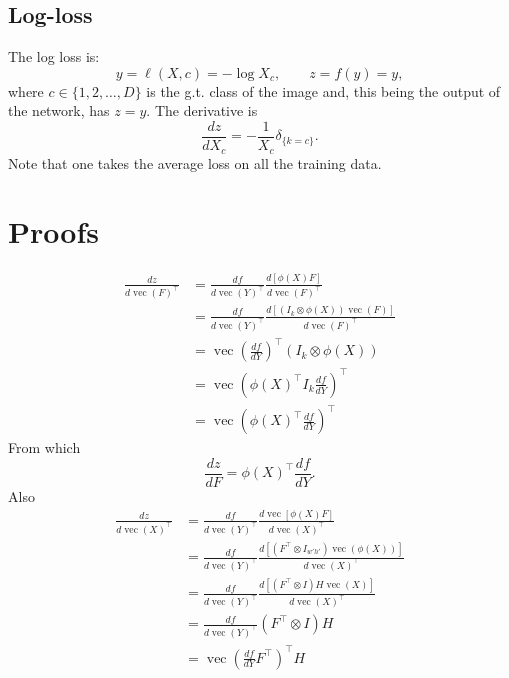 \documentclass[12pt]{article}
\newcommand{\vv}{\operatorname{vec}}
\begin{document}
\subsection{Log-loss}\label{s:loss}

The log loss is:
\[
 y = \ell(X,c) = - \log X_c, \qquad z = f(y) = y,
\]
where $c \in \{1,2,\dots,D\}$ is the g.t\@. class of the image and, this being the output of the network, has $z=y$. The derivative is
\[
\frac{dz}{dX_c} = - \frac{1}{X_c} \delta_{\{k = c\}}.
\]
Note that one takes the average loss on all the training data.

\appendix\section{Proofs}\label{s:proofs}

\begin{align*}
\frac{d z}{d \vv(F)^\top}
&=
\frac{d f}{d \vv(Y)^\top}
\frac{d [\phi(X) F]}{d\vv(F)^\top}
\\
&=
\frac{d f}{d \vv(Y)^\top}
\frac{d [\left(
I_k \otimes \phi(X)
\right)
\vv(F)]
}{d\vv(F)^\top}
\\
&=
\vv\left(\frac{d f}{d Y} \right)^\top
\left(
I_k \otimes \phi(X)
\right)
\\
&=
\vv\left(
\phi(X)^\top I_k \frac{d f}{d Y} 
\right)^\top
\\
&=
\vv\left(
\phi(X)^\top
\frac{d f}{d Y} 
\right)^\top
\end{align*}
From which
\[
\frac{dz}{dF}
=
\phi(X)^\top\frac{d f}{d Y}.
\]
Also
\begin{align*}
\frac{d z}{d \vv(X)^\top}
&=
\frac{d f}{d \vv(Y)^\top}
\frac{d \vv [\phi(X) F]}{d\vv(X)^\top}
\\
&=
\frac{d f}{d \vv(Y)^\top}
\frac{d [(F^\top \otimes I_{w'h'})\vv(\phi(X))]}{d\vv(X)^\top}
\\
&=
\frac{d f}{d \vv(Y)^\top}
\frac{d [(F^\top \otimes I)H \vv(X)]}{d\vv(X)^\top}
\\
&=
\frac{d f}{d \vv(Y)^\top} (F^\top\otimes I)H
\\
&=
\vv\left(
\frac{d f}{d Y}F^\top
\right)^\top H
\end{align*}
\end{document}
